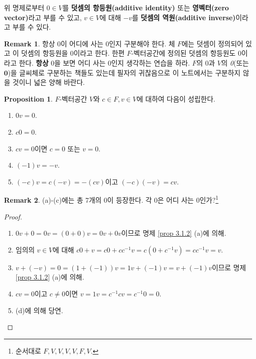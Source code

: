 \documentclass[11pt]{book}
\numberwithin{equation}{chapter}
\theoremstyle{definition}
\newtheorem{prop}[thm]{Proposition}
\newtheorem*{rem}{Remark}
\begin{document}
위 명제로부터 \(0 \in V\)를 \textbf{덧셈의 항등원(additive identity)} 또는 \textbf{영벡터(zero vector)}라고 부를 수 있고, \(v \in V\)에 대해 \(-v\)를 \textbf{덧셈의 역원(additive inverse)}이라고 부를 수 있다.

\begin{rem}
    항상 0이 어디에 사는 0인지 구분해야 한다. 체 \(F\)에는 덧셈이 정의되어 있고 이 덧셈의 항등원을 0이라고 한다. 한편 \(F\)-벡터공간에 정의된 덧셈의 항등원도 0이라고 한다. \textbf{항상} 0을 보면 어디 사는 0인지 생각하는 연습을 하라. \(F\)의 0과 \(V\)의 \textit{0}(또는 \(\mathbf{0}\))을 글씨체로 구분하는 책들도 있는데 필자의 귀찮음으로 이 노트에서는 구분하지 않을 것이니 넓은 양해 바란다.
\end{rem}

\begin{prop}
    \(F\)-벡터공간 \(V\)와 \(c \in F, v \in V\)에 대하여 다음이 성립한다.
    \begin{enumerate} [label=(\alph*), leftmargin=2\parindent]
        \item \(0v = 0\).
        \item \(c0 = 0\).
        \item \(cv = 0\)이면 \(c = 0\) 또는 \(v = 0\).
        \item \((-1)v = -v\).
        \item \((-c)v = c(-v) = -(cv)\)이고 \((-c)(-v) = cv\).
    \end{enumerate}
\end{prop}
\begin{rem}
    (a)-(c)에는 총 7개의 0이 등장한다. 각 0은 어디 사는 0인가?\footnote{순서대로 \(F, V, V, V, V, F, V\).}
\end{rem}
    \begin{proof}
        \quad

        \begin{enumerate} [label=(\alph*), leftmargin=2\parindent]
            \item \(0v + 0 = 0v = (0 + 0)v = 0v + 0v\)이므로 명제 \ref{prop 3.1.2} (a)에 의해.
            \item 임의의 \(v \in V\)에 대해 \(c0 + v = c0 + cc^{-1}v = c(0 + c^{-1}v) = cc^{-1}v = v\).
            \item \(v + (-v) = 0 = (1+(-1))v = 1v + (-1)v = v + (-1)v\)이므로 명제 \ref{prop 3.1.2} (a)에 의해.
            \item \(cv = 0\)이고 \(c \ne 0\)이면 \(v = 1v = c^{-1}cv = c^{-1}0 = 0\).
            \item (d)에 의해 당연.
        \end{enumerate}
    \end{proof}
\end{document}
